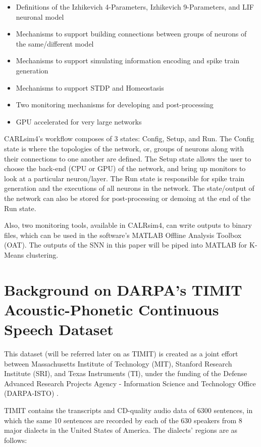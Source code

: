 \documentclass[11pt]{article}  %
\begin{document}
\begin{itemize}
	\item Definitions of the Izhikevich 4-Parameters, Izhikevich 9-Parameters, and LIF neuronal model
	\item Mechanisms to support building connections between groups of neurons of the same/different model
	\item Mechanisms to support simulating information encoding and spike train generation 
	\item Mechanisms to support STDP and Homeostasis
	\item Two monitoring mechanisms for developing and post-processing
	\item GPU accelerated for very large networks
\end{itemize}

CARLsim4's workflow composes of 3 states: Config, Setup, and Run. The Config state is where the topologies of the network, or, groups of neurons along with their connections to one another are defined. The Setup state allows the user to choose the back-end (CPU or GPU) of the network, and bring up monitors to look at a particular neuron/layer. The Run state is responsible for spike train generation and the executions of all neurons in the network. The state/output of the network can also be stored for post-processing or demoing at the end of the Run state.

Also, two monitoring tools, available in CALRsim4, can write outputs to binary files, which can be used in the software's MATLAB Offline Analysis Toolbox (OAT). The outputs of the SNN in this paper will be piped into MATLAB for K-Means clustering.

\section{Background on DARPA's TIMIT Acoustic-Phonetic Continuous Speech Dataset}
\label{dataset}

This dataset (will be referred later on as TIMIT) is created as a joint effort between Massachusetts Institute of Technology (MIT), Stanford Research Institute (SRI), and Texas Instruments (TI), under the funding of the Defense Advanced Research Projects Agency - Information Science and Technology Office (DARPA-ISTO) \cite{b7}. 

TIMIT contains the transcripts and CD-quality audio data of 6300 sentences, in which the same 10 sentences are recorded by each of the 630 speakers from 8 major dialects in the United States of America. The dialects' regions are as follows:
\end{document}
